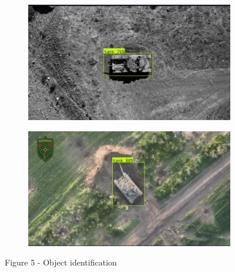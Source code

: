 \begin{figure}[H]
    \begin{subfigure}[b]{0.45\textwidth}
        \includegraphics[height=0.6\linewidth]{assets/17}
    \end{subfigure}\hfill
    \begin{subfigure}[b]{0.45\textwidth}
        \includegraphics[height=0.6\linewidth]{assets/18}
    \end{subfigure}
	\caption*{Figure 5 - Object identification}
\end{figure}

